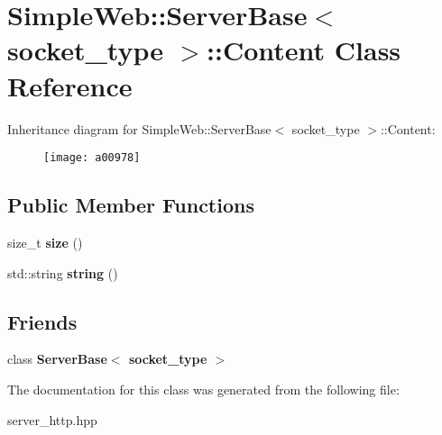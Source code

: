 \hypertarget{a00978}{}\section{Simple\+Web\+:\+:Server\+Base$<$ socket\+\_\+type $>$\+:\+:Content Class Reference}
\label{a00978}
Inheritance diagram for Simple\+Web\+:\+:Server\+Base$<$ socket\+\_\+type $>$\+:\+:Content\+:\begin{figure}[H]
\begin{center}
\leavevmode
\texttt{[image: a00978]}
\end{center}
\end{figure}
\subsection*{Public Member Functions}
\begin{DoxyCompactItemize}
\item 
\mbox{\label{a00978_adf8b2386c8ab32277341c6ae07cd4670}} 
size\+\_\+t {\bfseries size} ()
\item 
\mbox{\label{a00978_a6b4a72b0631c88ef576db28f54a768cb}} 
std\+::string {\bfseries string} ()
\end{DoxyCompactItemize}
\subsection*{Friends}
\begin{DoxyCompactItemize}
\item 
\mbox{\label{a00978_a01d54a7e16ca437c98ec571deca98dfc}} 
class {\bfseries Server\+Base$<$ socket\+\_\+type $>$}
\end{DoxyCompactItemize}


The documentation for this class was generated from the following file\+:\begin{DoxyCompactItemize}
\item 
server\+\_\+http.\+hpp\end{DoxyCompactItemize}
